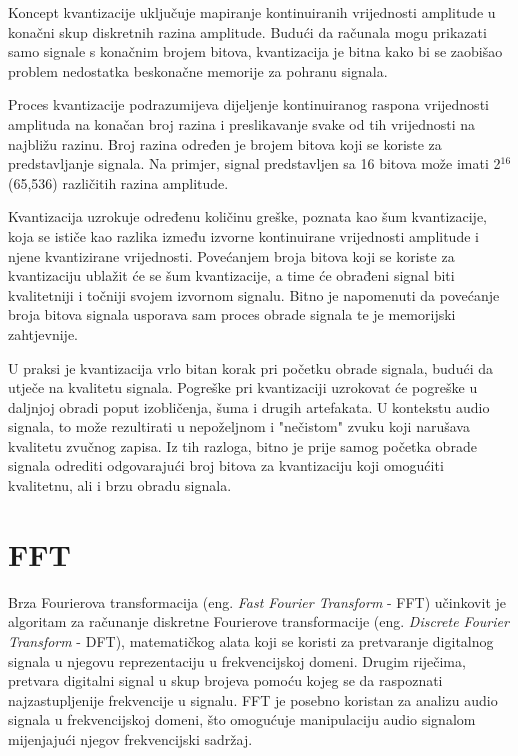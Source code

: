 \documentclass[times, utf8, seminar, numeric]{fer}
\begin{document}
Koncept kvantizacije uključuje mapiranje kontinuiranih vrijednosti amplitude u konačni skup diskretnih razina amplitude. Budući da računala mogu prikazati samo signale s konačnim brojem bitova, kvantizacija je bitna kako bi se zaobišao problem nedostatka beskonačne memorije za pohranu signala.\cite{tsividis2004digital}

Proces kvantizacije podrazumijeva dijeljenje kontinuiranog raspona vrijednosti amplituda na konačan broj razina i preslikavanje svake od tih vrijednosti na najbližu razinu. Broj razina određen je brojem bitova koji se koriste za predstavljanje signala. Na primjer, signal predstavljen sa 16 bitova može imati 2$^{16}$ (65,536) različitih razina amplitude.

Kvantizacija uzrokuje određenu količinu greške, poznata kao šum kvantizacije, koja se ističe kao razlika između izvorne kontinuirane vrijednosti amplitude i njene kvantizirane vrijednosti. Povećanjem broja bitova koji se koriste za kvantizaciju ublažit će se šum kvantizacije, a time će obrađeni signal biti kvalitetniji i točniji svojem izvornom signalu. Bitno je napomenuti da povećanje broja bitova signala usporava sam proces obrade signala te je memorijski zahtjevnije.

U praksi je kvantizacija vrlo bitan korak pri početku obrade signala, budući da utječe na kvalitetu signala. Pogreške pri kvantizaciji uzrokovat će pogreške u daljnjoj obradi poput izobličenja, šuma i drugih artefakata. U kontekstu audio signala, to može rezultirati u nepoželjnom i "nečistom" zvuku koji narušava kvalitetu zvučnog zapisa. Iz tih razloga, bitno je prije samog početka obrade signala odrediti odgovarajući broj bitova za kvantizaciju koji omogućiti kvalitetnu, ali i brzu obradu signala.\cite{gersho2012vector}

\section{FFT}

Brza Fourierova transformacija (eng. \textit{Fast Fourier Transform} - FFT) učinkovit je algoritam za računanje diskretne Fourierove transformacije (eng. \textit{Discrete Fourier Transform} - DFT), matematičkog alata koji se koristi za pretvaranje digitalnog signala u njegovu reprezentaciju u frekvencijskoj domeni. Drugim riječima, pretvara digitalni signal u skup brojeva pomoću kojeg se da raspoznati najzastupljenije frekvencije u signalu. FFT je posebno koristan za analizu audio signala u frekvencijskoj domeni, što omogućuje manipulaciju audio signalom mijenjajući njegov frekvencijski sadržaj.\cite{heideman1985gauss}
\end{document}
